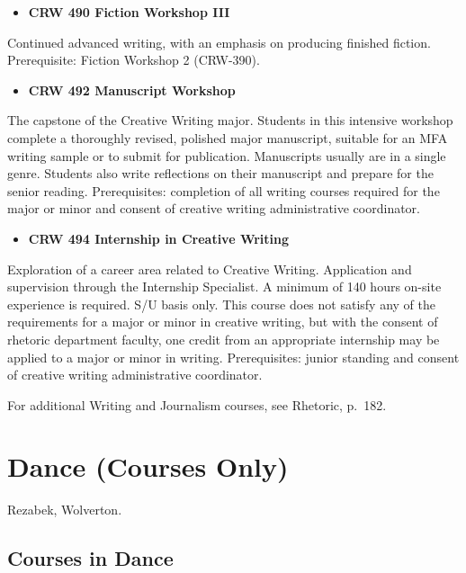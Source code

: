 \documentclass[
  letterpaper,
]{scrbook}
\providecommand{\tightlist}{%
  \setlength{\itemsep}{0pt}\setlength{\parskip}{0pt}}
\begin{document}
\begin{itemize}
\tightlist
\item
  \textbf{CRW 490 Fiction Workshop III}
\end{itemize}

Continued advanced writing, with an emphasis on producing finished
fiction. Prerequisite: Fiction Workshop 2 (CRW-390).

\begin{itemize}
\tightlist
\item
  \textbf{CRW 492 Manuscript Workshop}
\end{itemize}

The capstone of the Creative Writing major. Students in this intensive
workshop complete a thoroughly revised, polished major manuscript,
suitable for an MFA writing sample or to submit for publication.
Manuscripts usually are in a single genre. Students also write
reflections on their manuscript and prepare for the senior reading.
Prerequisites: completion of all writing courses required for the major
or minor and consent of creative writing administrative coordinator.

\begin{itemize}
\tightlist
\item
  \textbf{CRW 494 Internship in Creative Writing}
\end{itemize}

Exploration of a career area related to Creative Writing. Application
and supervision through the Internship Specialist. A minimum of 140
hours on-site experience is required. S/U basis only. This course does
not satisfy any of the requirements for a major or minor in creative
writing, but with the consent of rhetoric department faculty, one credit
from an appropriate internship may be applied to a major or minor in
writing. Prerequisites: junior standing and consent of creative writing
administrative coordinator.

For additional Writing and Journalism courses, see Rhetoric, p.~182.

\section{Dance (Courses Only)}\label{sec-dance}

Rezabek, Wolverton.

\subsection{Courses in Dance}\label{courses-in-dance}
\end{document}
